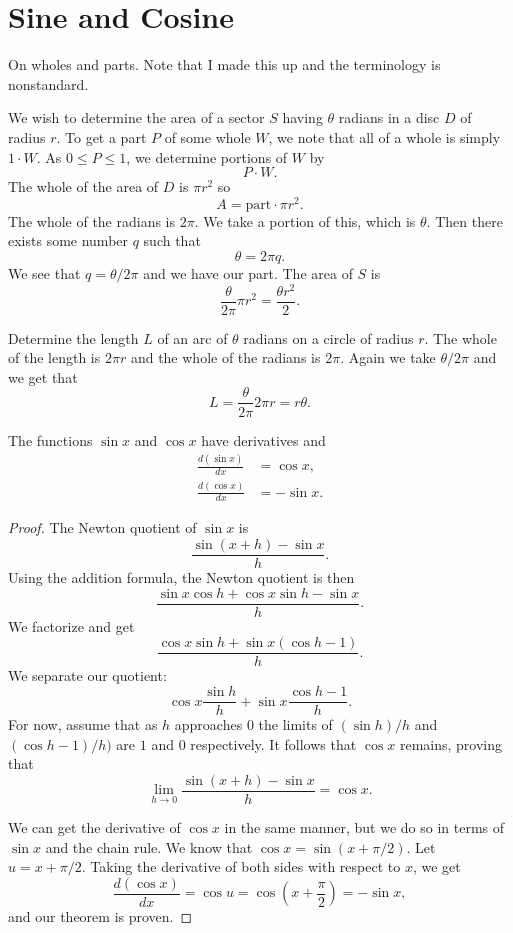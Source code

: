 \chapter*{Sine and Cosine}

On wholes and parts. Note that I made this up and the terminology is nonstandard.

We wish to determine the area of a sector $S$ having $\theta$ radians in a disc $D$ of radius $r$. To get a part $P$ of some whole $W$, we note that all of a whole is simply $1 \cdot W$. As $0 \le P \le 1$, we determine portions of $W$ by
\[P \cdot W.\]
The whole of the area of $D$ is $\pi r^2$ so
\[A = \text{part} \cdot \pi r^2.\]
The whole of the radians is $2\pi$. We take a portion of this, which is $\theta$. Then there exists some number $q$ such that
\[\theta = 2\pi q.\]
We see that $q = \theta/2\pi$ and we have our part. The area of $S$ is
\[\frac{\theta}{2\pi} \pi r^2 = \frac{\theta r^2}{2}.\]

Determine the length $L$ of an arc of $\theta$ radians on a circle of radius $r$. The whole of the length is $2\pi r$ and the whole of the radians is $2\pi$. Again we take $\theta/2\pi$ and we get that
\[L = \frac{\theta}{2\pi} 2\pi r = r\theta.\] 

\begin{theorem}
  The functions $\sin x$ and $\cos x$ have derivatives and
  \begin{align*}
    \frac{d(\sin x)}{dx} &= \cos x,\\
    \frac{d(\cos x)}{dx} &= -\sin x.
  \end{align*}
\end{theorem}

\begin{proof}
  The Newton quotient of $\sin x$ is
  \[\frac{\sin(x + h) - \sin x}{h}.\]
  Using the addition formula, the Newton quotient is then
  \[\frac{\sin x \cos h + \cos x \sin h - \sin x}{h}.\]
  We factorize and get
  \[\frac{\cos x \sin h + \sin x(\cos h - 1)}{h}.\]
  We separate our quotient:
  \[\cos x \frac{\sin h}{h} + \sin x \frac{\cos h - 1}{h}.\]
  For now, assume that as $h$ approaches $0$ the limits of $(\sin h)/h$ and $(\cos h - 1)/h)$ are $1$ and $0$ respectively.
  It follows that $\cos x$ remains, proving that
  \[\lim_{h\to0} \frac{\sin(x + h) - \sin x}{h} = \cos x.\]
  
  We can get the derivative of $\cos x$ in the same manner, but we do so in terms of $\sin x$ and the chain rule. We know that $\cos x = \sin(x + \pi/2)$. Let $u = x + \pi/2$. Taking the derivative of both sides with respect to $x$, we get
  \[\frac{d(\cos x)}{dx} = \cos u = \cos \left(x + \frac{\pi}{2} \right) = -\sin x,\]
  and our theorem is proven.
\end{proof}

